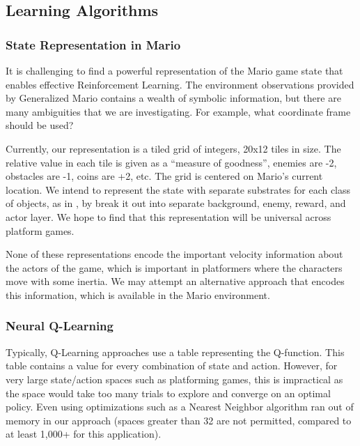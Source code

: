 \documentclass{article}
\begin{document}
\subsection{Learning Algorithms}

\subsubsection{State Representation in Mario}
It is challenging to find a powerful representation of the Mario game state that enables effective Reinforcement Learning. The environment observations provided by Generalized Mario contains a wealth of symbolic information, but there are many ambiguities that we are investigating. For example, what coordinate frame should be used? 

Currently, our representation is a tiled grid of integers, 20x12 tiles in size. The relative value in each tile is given as a ``measure of goodness'', enemies are -2, obstacles are -1, coins are +2, etc. The grid is centered on Mario's current location. We intend to represent the state with separate substrates for each class of objects, as in \cite{Hauskneck13}, by break it out into separate background, enemy, reward, and actor layer. We hope to find that this representation will be universal across platform games. 

None of these representations encode the important velocity information about the actors of the game, which is important in platformers where the characters move with some inertia. We may attempt an alternative approach that encodes this information, which is available in the Mario environment.


\subsubsection{Neural Q-Learning}

Typically, Q-Learning approaches use a table representing the Q-function. This table contains a value for every combination of state and action. However, for very large state/action spaces such as platforming games, this is impractical as the space would take too many trials to explore and converge on an optimal policy. Even using optimizations such as a Nearest Neighbor algorithm ran out of memory in our approach (spaces greater than 32 are not permitted, compared to at least 1,000+ for this application). 
\end{document}
